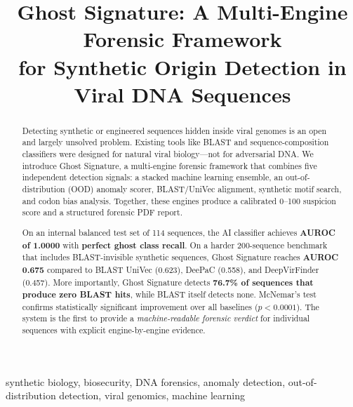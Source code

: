 \documentclass[conference]{IEEEtran}
\begin{document}
\title{Ghost Signature: A Multi-Engine Forensic Framework\\for Synthetic Origin Detection in Viral DNA Sequences}

\author{
}

\maketitle

\begin{abstract}
Detecting synthetic or engineered sequences hidden inside viral genomes is an open and largely unsolved problem. Existing tools like BLAST and sequence-composition classifiers were designed for natural viral biology---not for adversarial DNA. We introduce Ghost Signature, a multi-engine forensic framework that combines five independent detection signals: a stacked machine learning ensemble, an out-of-distribution (OOD) anomaly scorer, BLAST/UniVec alignment, synthetic motif search, and codon bias analysis. Together, these engines produce a calibrated 0--100 suspicion score and a structured forensic PDF report.

On an internal balanced test set of 114 sequences, the AI classifier achieves \textbf{AUROC of 1.0000} with \textbf{perfect ghost class recall}. On a harder 200-sequence benchmark that includes BLAST-invisible synthetic sequences, Ghost Signature reaches \textbf{AUROC 0.675} compared to BLAST UniVec (0.623), DeePaC (0.558), and DeepVirFinder (0.457). More importantly, Ghost Signature detects \textbf{76.7\% of sequences that produce zero BLAST hits}, while BLAST itself detects none. McNemar's test confirms statistically significant improvement over all baselines ($p < 0.0001$). The system is the first to provide a \textit{machine-readable forensic verdict} for individual sequences with explicit engine-by-engine evidence.
\end{abstract}

\begin{IEEEkeywords}
synthetic biology, biosecurity, DNA forensics, anomaly detection, out-of-distribution detection, viral genomics, machine learning
\end{IEEEkeywords}
\end{document}

